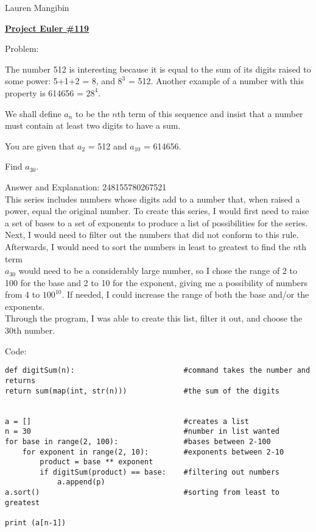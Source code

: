 \documentclass{article}
\begin{document}
\begin{flushright}
Lauren Mangibin
\end{flushright}

\begin{center}
    \underline{\textbf{Project Euler \#119}}
\end{center}

Problem:

The number 512 is interesting because it is equal to the sum of its digits raised to some power: 5+1+2 = 8, and $8^3$ = 512. Another example of a number with this property is 614656 = $28^4$.

We shall define $a_n$ to be the $n$th term of this sequence and insist that a number must contain at least two digits to have a sum.

You are given that $a_2$ = 512 and $a_{10}$ = 614656.

Find $a_{30}$.

Answer and Explanation:
248155780267521\\

\hspace{5mm} This series includes numbers whose digits add to a number that, when raised a power, equal the original number. To create this series, I would first need to raise a set of bases to a set of exponents to produce a list of possibilities for the series. Next, I would need to filter out the numbers that did not conform to this rule. Afterwards, I would need to sort the numbers in least to greatest to find the $n$th term\\

\hspace{5mm} $a_{30}$ would need to be a considerably large number, so I chose the range of 2 to 100 for the base and 2 to 10 for the exponent, giving me a possibility of numbers from 4 to $100^{10}$. If needed, I could increase the range of both the base and/or the exponents. \\

Through the program, I was able to create this list, filter it out, and choose the 30th number.



Code:
    \begin{verbatim}
def digitSum(n):                         #command takes the number and returns 
return sum(map(int, str(n)))             #the sum of the digits


a = []                                   #creates a list
n = 30                                   #number in list wanted
for base in range(2, 100):               #bases between 2-100
    for exponent in range(2, 10):        #exponents between 2-10
        product = base ** exponent 
        if digitSum(product) == base:    #filtering out numbers
            a.append(p)
a.sort()                                 #sorting from least to greatest

print (a[n-1])

  \end{verbatim}
\end{document}
